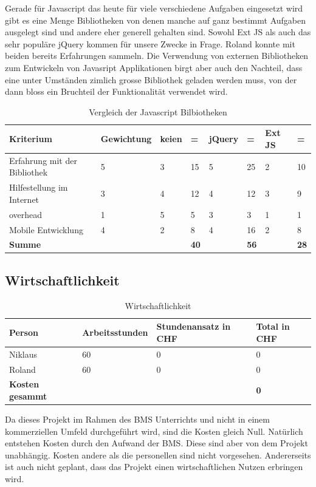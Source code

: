 \documentclass[11pt,paper=a4,final]{scrartcl}
\begin{document}
Gerade f\"ur Javascript das heute f\"ur viele verschiedene Aufgaben eingesetzt
wird gibt es eine Menge Bibliotheken von denen manche auf ganz bestimmt Aufgaben
ausgelegt sind und andere eher generell gehalten sind. Sowohl Ext JS als auch
das sehr popul\"are jQuery kommen f\"ur unsere Zwecke in Frage. Roland konnte
mit beiden bereits Erfahrungen sammeln. Die Verwendung von externen Bibliotheken
zum Entwickeln von Javasript Applikationen birgt aber auch den Nachteil, dass
eine unter Umst\"anden zimlich grosse Bibliothek geladen werden muss, von der
dann bloss ein Bruchteil der Funktionalit\"at verwendet wird.
\begin{table}[h!]
  \centering
  \begin{tabular}{|p{5cm}|l|l|l|l|l|l|l|} \hline
    \bf Kriterium & \bf Gewichtung & \bf keien & \bf = & \bf jQuery &
    \bf = & \bf Ext JS & \bf = \\ \hline
      Erfahrung mit der Bibliothek & 5 & 3 & 15 & 5 & 25 & 2 & 10 \\ \hline
      Hilfestellung im Internet    & 3 & 4 & 12 & 4 & 12 & 3 & 9  \\ \hline
      overhead                     & 1 & 5 & 5  & 3 & 3  & 1 & 1  \\ \hline
      Mobile Entwicklung	   & 4 & 2 & 8  & 4 & 16 & 2 & 8  \\ \hline
      \bf Summe			   &   &   & \cellcolor{red!80!} \bf 40 &   &
      \cellcolor{green!80!} \bf 56 &   & \cellcolor{red!80!} \bf 28 \\ \hline
  \end{tabular}
  \caption{Vergleich der Javascript Bilbiotheken}
  \label{tab:libraries}
\end{table}
\subsection{Wirtschaftlichkeit}
\begin{table}[h!]
  \centering
  \begin{tabular}{|l|l|l|l|}\hline
    \bf Person & \bf Arbeitsstunden & \bf Stundenansatz in CHF & \bf Total in
    CHF \\ \hline
    Niklaus & 60 & 0 & 0 \\ \hline
    Roland & 60 & 0 & 0 \\ \hline
    \bf Kosten gesammt &  & & \bf 0 \\ \hline
  \end{tabular}
  \caption{Wirtschaftlichkeit}
  \label{tab:wirtschaftlichkeit}
\end{table}
Da dieses Projekt im Rahmen des BMS Unterrichts und nicht in einem kommerziellen
Umfeld durchgef\"uhrt wird, sind die Kosten gleich Null. Nat\"urlich entstehen
Kosten durch den Aufwand der BMS. Diese sind aber von dem Projekt unabh\"angig.
Kosten andere als die personellen sind nicht vorgesehen. Andererseits ist auch
nicht geplant, dass das Projekt einen wirtschaftlichen Nutzen erbringen wird.
\end{document}
